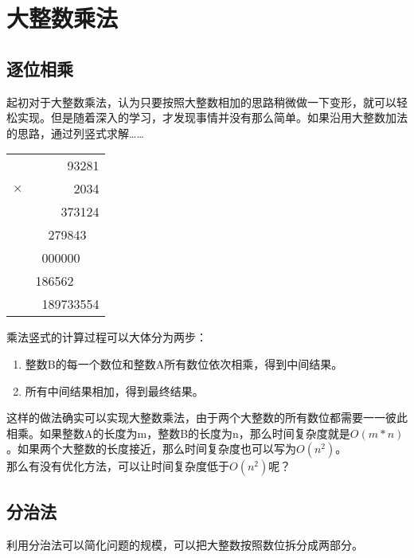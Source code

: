 \newpage

\section{大整数乘法}

\subsection{逐位相乘}

起初对于大整数乘法，认为只要按照大整数相加的思路稍微做一下变形，就可以轻松实现。但是随着深入的学习，才发现事情并没有那么简单。如果沿用大整数加法的思路，通过列竖式求解……

\begin{table}[H]
	\centering
	\begin{tabular}{cD{.}{.}{3}}
		           & 93281         \\
		$ \times $ & 2034          \\
		\hline
		           & 373124        \\
		           & 279843\ \     \\
		           & 000000\ \ \   \\
		           & 186562\ \ \ \ \\
		\hline
		           & 189733554
	\end{tabular}
\end{table}

乘法竖式的计算过程可以大体分为两步：

\begin{enumerate}
	\item 整数B的每一个数位和整数A所有数位依次相乘，得到中间结果。
	\item 所有中间结果相加，得到最终结果。
\end{enumerate}

这样的做法确实可以实现大整数乘法，由于两个大整数的所有数位都需要一一彼此相乘。如果整数A的长度为m，整数B的长度为n，那么时间复杂度就是$ O(m * n) $。如果两个大整数的长度接近，那么时间复杂度也可以写为$ O(n^2) $。\\

那么有没有优化方法，可以让时间复杂度低于$ O(n^2) $呢？\\

\subsection{分治法}

利用分治法可以简化问题的规模，可以把大整数按照数位拆分成两部分。

